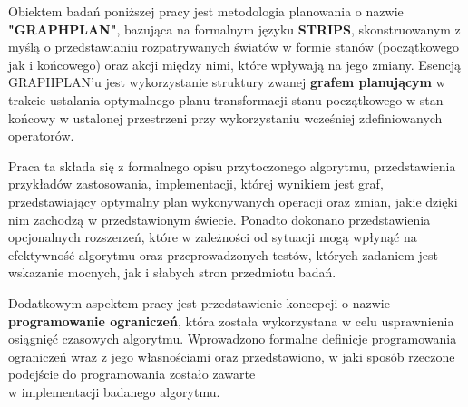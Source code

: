 \begin{streszczenie}
    Obiektem badań poniższej pracy jest metodologia planowania
    o nazwie \textbf{"GRAPHPLAN"}, bazująca na formalnym języku \textbf{STRIPS}, skonstruowanym z myślą o przedstawianiu 
    rozpatrywanych światów w formie stanów (początkowego jak i końcowego) 
    oraz akcji między nimi, które wpływają na jego zmiany.
    Esencją GRAPHPLAN'u jest wykorzystanie
    struktury zwanej \textbf{grafem planującym} w trakcie ustalania optymalnego planu transformacji
    stanu początkowego w stan końcowy w ustalonej przestrzeni przy wykorzystaniu wcześniej zdefiniowanych
    operatorów. 

    Praca ta składa się z formalnego opisu przytoczonego algorytmu, przedstawienia przykładów zastosowania,
    implementacji, której wynikiem jest graf, przedstawiający optymalny plan wykonywanych operacji oraz zmian, jakie dzięki nim zachodzą w 
    przedstawionym świecie. Ponadto dokonano przedstawienia opcjonalnych rozszerzeń, które w zależności od sytuacji mogą wpłynąć na efektywność algorytmu
    oraz przeprowadzonych testów, których zadaniem jest wskazanie mocnych, jak i słabych stron przedmiotu badań. 

    Dodatkowym aspektem pracy jest przedstawienie koncepcji o nazwie \textbf{programowanie ograniczeń}, 
    która została wykorzystana w celu usprawnienia osiągnięć czasowych algorytmu. 
    Wprowadzono formalne definicje programowania ograniczeń wraz z jego własnościami oraz przedstawiono, w jaki sposób rzeczone podejście do 
    programowania zostało zawarte \\
     w implementacji badanego algorytmu.

\end{streszczenie}

